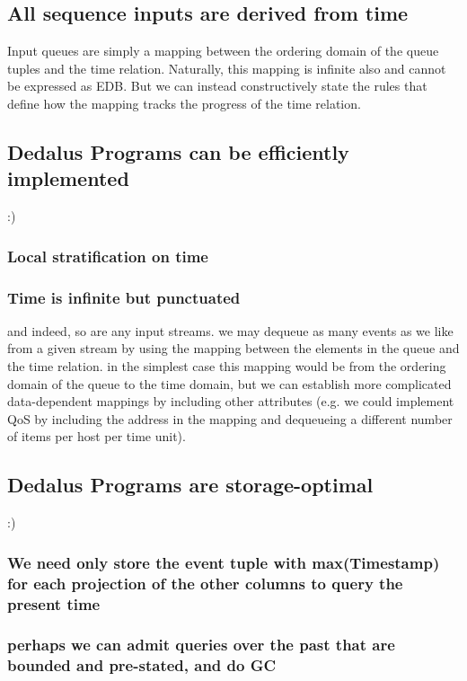 \documentclass{acm_proc_article-sp-sigmod09}
\begin{document}
\subsection{All sequence inputs are derived from time}

Input queues are simply a mapping between the ordering domain of the queue tuples and the time relation.  Naturally, this mapping
is infinite also and cannot be expressed as EDB.  But we can instead constructively state the rules that define how the mapping 
tracks the progress of the time relation.

\subsection{Dedalus Programs can be efficiently implemented}

:)

\subsubsection{Local stratification on time}

\subsubsection{Time is infinite but punctuated}

and indeed, so are any input streams.  we may dequeue as many events as we like from a given stream by using the mapping
between the elements in the queue and the time relation.  in the simplest case this mapping would be from the ordering domain 
of the queue to the time domain, but we can establish more complicated data-dependent mappings by including other attributes 
(e.g. we could implement QoS by including the address in the mapping and dequeueing a different number of items per host
per time unit).

\subsection{Dedalus Programs are storage-optimal}

:)

\subsubsection{We need only store the event tuple with max(Timestamp) for each projection of the other columns to query the present time}


\subsubsection{perhaps we can admit queries over the past that are bounded and pre-stated, and do GC}
\end{document}

